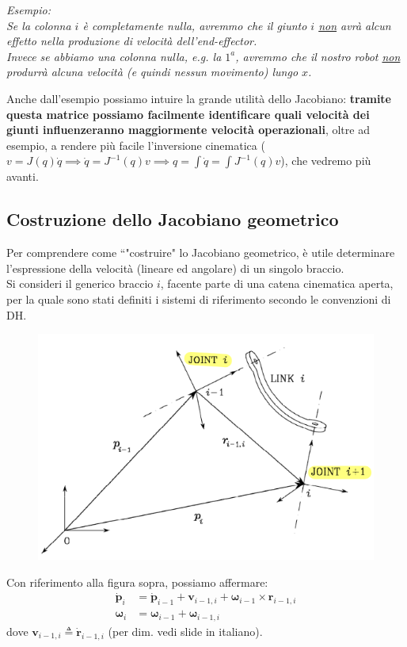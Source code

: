 \vspace*{5pt}
\textit{\small Esempio:}\\
\textit{
\small
Se la colonna $i$ è completamente nulla, avremmo che il giunto $i$ \underline{non} avrà alcun effetto nella produzione di velocità dell'end-effector.\\
Invece se abbiamo una colonna nulla, e.g. la $1^a$, avremmo che il nostro robot \underline{non} produrrà alcuna velocità (e quindi nessun movimento) lungo $x$.
}

\vspace*{5pt}
Anche dall'esempio possiamo intuire la grande utilità dello Jacobiano: \textbf{tramite questa matrice possiamo facilmente identificare quali velocità dei giunti influenzeranno maggiormente velocità operazionali}, oltre ad esempio, a rendere più facile l'inversione cinematica ($v = J(q)\dot{q} \implies \dot{q} = J^{-1}(q)v \implies q = \int \dot{q} = \int J^{-1}(q)v$), che vedremo più avanti.



\subsection{Costruzione dello Jacobiano geometrico}
Per comprendere come “"costruire" lo Jacobiano geometrico, è utile determinare l’espressione della velocità (lineare ed angolare) di un singolo braccio.\\
Si consideri il generico braccio $i$, facente parte di una catena cinematica aperta, per la quale sono stati definiti i sistemi di riferimento secondo le convenzioni di DH.

\begin{figure}[H]
	\centering
	\includegraphics[width=0.5\linewidth]{images/diff_kine_2}
	\label{fig:diffkine2}
\end{figure}

Con riferimento alla figura sopra, possiamo affermare:
\begin{align*}
	\bm{\dot{p}}_i &= \bm{\dot{p}}_{i-1} + \bm{v}_{i-1, i} + \bm{\omega}_{i-1} \times \bm{r}_{i-1, i} \\
	\bm{\omega}_i &= \bm{\omega}_{i-1} + \bm{\omega}_{i-1, i}
\end{align*}
dove $\bm{v}_{i-1, i} \triangleq \bm{\dot{r}}_{i-1, i}$ (per dim. vedi slide in italiano).\\


